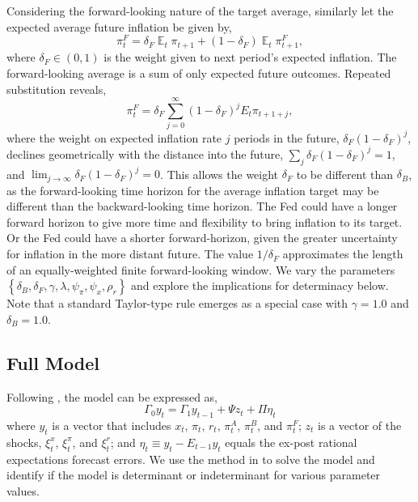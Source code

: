 \documentclass[english,authoryear,12pt]{elsarticle}
\DeclareMathOperator{\E}{\mathbb{E}}
\begin{document}
Considering the forward-looking nature of the target average, similarly let the expected average future inflation be given by,
\begin{equation}\label{eq:forward}
	\pi_t^F = \delta_F \E_t \pi_{t+1} + (1-\delta_F) \E_t \pi_{t+1}^F,
\end{equation}
where $\delta_F \in (0,1)$ is the weight given to next period's expected inflation. The forward-looking average is a sum of only expected future outcomes. Repeated substitution reveals,
\begin{equation}\label{eq:forward_all}
	\pi_t^F = \delta_F \sum_{j=0}^{\infty} (1-\delta_F)^j E_t \pi_{t+1+j},
\end{equation}
where the weight on expected inflation rate $j$ periods in the future, $\delta_F (1-\delta_F)^{j}$, declines geometrically with the distance into the future, $\sum_j \delta_F (1-\delta_F)^{j}=1$, and $\lim_{j \to \infty} \delta_F (1-\delta_F)^j=0$. This allows the weight $\delta_F$ to be different than $\delta_B$, as the forward-looking time horizon for the average inflation target may be different than the backward-looking time horizon. The Fed could have a longer forward horizon to give more time and flexibility to bring inflation to its target. Or the Fed could have a shorter forward-horizon, given the greater uncertainty for inflation in the more distant future. The value $1/ \delta_F$ approximates the length of an equally-weighted finite forward-looking window. We vary the parameters $\left\{\delta_B, \delta_F, \gamma, \lambda, \psi_\pi, \psi_x, \rho_r \right\}$ and explore the implications for determinacy below. Note that a standard Taylor-type rule emerges as a special case with $\gamma=1.0$ and $\delta_B=1.0$.

\subsection{Full Model}

Following \citet{sims2002}, the model can be expressed as,
\begin{equation}
	\Gamma_0 y_t = \Gamma_1 y_{t-1} + \Psi z_t + \Pi \eta_t
\end{equation}
where $y_t$ is a vector that includes $x_t$, $\pi_t$, $r_t$, $\pi_t^A$, $\pi_t^B$, and $\pi_t^F$; $z_t$ is a vector of the shocks, $\xi_t^x$, $\xi_t^\pi$, and $\xi_t^r$; and $\eta_t \equiv y_t - E_{t-1} y_t$ equals the ex-post rational expectations forecast errors. We use the method in \citet{sims2002} to solve the model and identify if the model is determinant or indeterminant for various parameter values.
\end{document}

